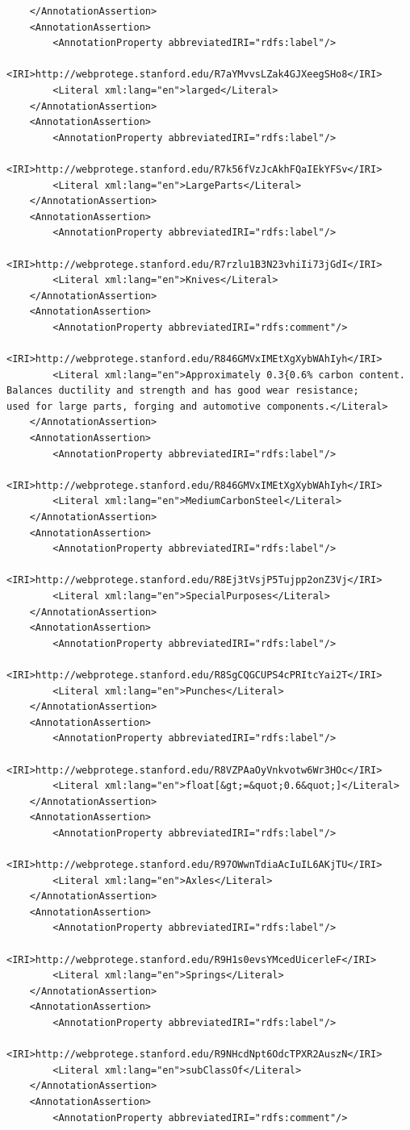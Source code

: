 \documentclass[12pt]{article}
\begin{document}
{\begin{lstlisting}
	</AnnotationAssertion>
	<AnnotationAssertion>
		<AnnotationProperty abbreviatedIRI="rdfs:label"/>
		<IRI>http://webprotege.stanford.edu/R7aYMvvsLZak4GJXeegSHo8</IRI>
		<Literal xml:lang="en">larged</Literal>
	</AnnotationAssertion>
	<AnnotationAssertion>
		<AnnotationProperty abbreviatedIRI="rdfs:label"/>
		<IRI>http://webprotege.stanford.edu/R7k56fVzJcAkhFQaIEkYFSv</IRI>
		<Literal xml:lang="en">LargeParts</Literal>
	</AnnotationAssertion>
	<AnnotationAssertion>
		<AnnotationProperty abbreviatedIRI="rdfs:label"/>
		<IRI>http://webprotege.stanford.edu/R7rzlu1B3N23vhiIi73jGdI</IRI>
		<Literal xml:lang="en">Knives</Literal>
	</AnnotationAssertion>
	<AnnotationAssertion>
		<AnnotationProperty abbreviatedIRI="rdfs:comment"/>
		<IRI>http://webprotege.stanford.edu/R846GMVxIMEtXgXybWAhIyh</IRI>
		<Literal xml:lang="en">Approximately 0.3{0.6% carbon content.
Balances ductility and strength and has good wear resistance;
used for large parts, forging and automotive components.</Literal>
	</AnnotationAssertion>
	<AnnotationAssertion>
		<AnnotationProperty abbreviatedIRI="rdfs:label"/>
		<IRI>http://webprotege.stanford.edu/R846GMVxIMEtXgXybWAhIyh</IRI>
		<Literal xml:lang="en">MediumCarbonSteel</Literal>
	</AnnotationAssertion>
	<AnnotationAssertion>
		<AnnotationProperty abbreviatedIRI="rdfs:label"/>
		<IRI>http://webprotege.stanford.edu/R8Ej3tVsjP5Tujpp2onZ3Vj</IRI>
		<Literal xml:lang="en">SpecialPurposes</Literal>
	</AnnotationAssertion>
	<AnnotationAssertion>
		<AnnotationProperty abbreviatedIRI="rdfs:label"/>
		<IRI>http://webprotege.stanford.edu/R8SgCQGCUPS4cPRItcYai2T</IRI>
		<Literal xml:lang="en">Punches</Literal>
	</AnnotationAssertion>
	<AnnotationAssertion>
		<AnnotationProperty abbreviatedIRI="rdfs:label"/>
		<IRI>http://webprotege.stanford.edu/R8VZPAaOyVnkvotw6Wr3HOc</IRI>
		<Literal xml:lang="en">float[&gt;=&quot;0.6&quot;]</Literal>
	</AnnotationAssertion>
	<AnnotationAssertion>
		<AnnotationProperty abbreviatedIRI="rdfs:label"/>
		<IRI>http://webprotege.stanford.edu/R97OWwnTdiaAcIuIL6AKjTU</IRI>
		<Literal xml:lang="en">Axles</Literal>
	</AnnotationAssertion>
	<AnnotationAssertion>
		<AnnotationProperty abbreviatedIRI="rdfs:label"/>
		<IRI>http://webprotege.stanford.edu/R9H1s0evsYMcedUicerleF</IRI>
		<Literal xml:lang="en">Springs</Literal>
	</AnnotationAssertion>
	<AnnotationAssertion>
		<AnnotationProperty abbreviatedIRI="rdfs:label"/>
		<IRI>http://webprotege.stanford.edu/R9NHcdNpt6OdcTPXR2AuszN</IRI>
		<Literal xml:lang="en">subClassOf</Literal>
	</AnnotationAssertion>
	<AnnotationAssertion>
		<AnnotationProperty abbreviatedIRI="rdfs:comment"/>

\end{lstlisting}}
\end{document}
